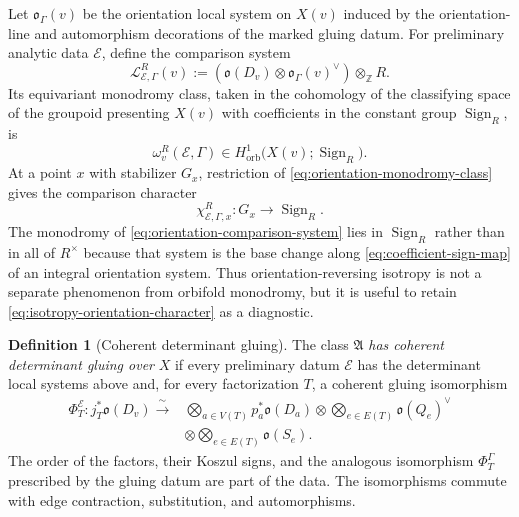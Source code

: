 \documentclass[11pt,letterpaper,twoside]{article}
\theoremstyle{plain}
\theoremstyle{definition}
\newtheorem{definition}[theorem]{Definition}
\theoremstyle{remark}
\begin{document}
Let $\mathfrak o_\Gamma(v)$ be the orientation local system on $X(v)$ induced by the orientation-line and automorphism decorations of the marked gluing datum.  For preliminary analytic data $\mathcal E$, define the comparison system
\begin{equation}\label{eq:orientation-comparison-system}
 \mathcal L^R_{\mathcal E,\Gamma}(v)
 :=\left(
 \mathfrak o(D_v)\otimes
 \mathfrak o_\Gamma(v)^\vee
 \right)\otimes_{\mathbb Z}R.
\end{equation}
Its equivariant monodromy class, taken in the cohomology of the classifying space of the groupoid presenting $X(v)$ with coefficients in the constant group $\operatorname{Sign}_R$, is
\begin{equation}\label{eq:orientation-monodromy-class}
 \omega^R_v(\mathcal E,\Gamma)
 \in
 H^1_{\mathrm{orb}}
 \bigl(X(v);\operatorname{Sign}_R\bigr).
\end{equation}
At a point $x$ with stabilizer $G_x$, restriction of \eqref{eq:orientation-monodromy-class} gives the comparison character
\begin{equation}\label{eq:isotropy-orientation-character}
 \chi^R_{\mathcal E,\Gamma,x}:
 G_x\longrightarrow\operatorname{Sign}_R.
\end{equation}
The monodromy of \eqref{eq:orientation-comparison-system} lies in $\operatorname{Sign}_R$ rather than in all of $R^\times$ because that system is the base change along \eqref{eq:coefficient-sign-map} of an integral orientation system.  Thus orientation-reversing isotropy is not a separate phenomenon from orbifold monodromy, but it is useful to retain \eqref{eq:isotropy-orientation-character} as a diagnostic.

\begin{definition}[Coherent determinant gluing]\label{def:determinant-excisive}
The class $\mathfrak A$ \emph{has coherent determinant gluing over} $X$ if every preliminary datum $\mathcal E$ has the determinant local systems above and, for every factorization $T$, a coherent gluing isomorphism
\begin{equation}\label{eq:determinant-line-gluing}
\begin{aligned}
 \Phi_T^{\mathcal E}:j_T^*\mathfrak o(D_v)
 \xrightarrow{\ \sim\ }{}
 &\bigotimes_{a\in V(T)}p_a^*\mathfrak o(D_a)
 \otimes\bigotimes_{e\in E(T)}\mathfrak o(Q_e)^\vee\\
 &\otimes\bigotimes_{e\in E(T)}\mathfrak o(S_e).
\end{aligned}
\end{equation}
The order of the factors, their Koszul signs, and the analogous isomorphism $\Phi_T^\Gamma$ prescribed by the gluing datum are part of the data.  The isomorphisms commute with edge contraction, substitution, and automorphisms.
\end{definition}
\end{document}
